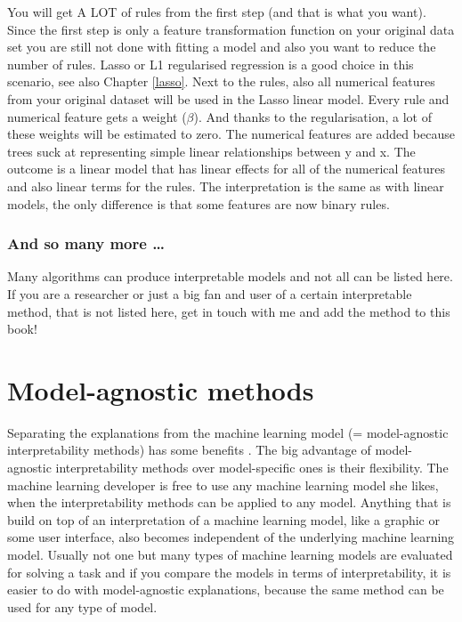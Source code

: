 \documentclass[12pt,]{krantz}
\theoremstyle{definition}
\theoremstyle{definition}
\theoremstyle{definition}
\theoremstyle{remark}
\begin{document}
You will get A LOT of rules from the first step (and that is what you
want). Since the first step is only a feature transformation function on
your original data set you are still not done with fitting a model and
also you want to reduce the number of rules. Lasso or L1 regularised
regression is a good choice in this scenario, see also Chapter
\ref{lasso}. Next to the rules, also all numerical features from your
original dataset will be used in the Lasso linear model. Every rule and
numerical feature gets a weight (\(\beta\)). And thanks to the
regularisation, a lot of these weights will be estimated to zero. The
numerical features are added because trees suck at representing simple
linear relationships between y and x. The outcome is a linear model that
has linear effects for all of the numerical features and also linear
terms for the rules. The interpretation is the same as with linear
models, the only difference is that some features are now binary rules.

\subsection{And so many more \ldots{}}\label{and-so-many-more}

Many algorithms can produce interpretable models and not all can be
listed here. If you are a researcher or just a big fan and user of a
certain interpretable method, that is not listed here, get in touch with
me and add the method to this book!

\chapter{Model-agnostic methods}\label{agnostic}

Separating the explanations from the machine learning model (=
model-agnostic interpretability methods) has some benefits
\citep{Ribeiro2016b}. The big advantage of model-agnostic
interpretability methods over model-specific ones is their flexibility.
The machine learning developer is free to use any machine learning model
she likes, when the interpretability methods can be applied to any
model. Anything that is build on top of an interpretation of a machine
learning model, like a graphic or some user interface, also becomes
independent of the underlying machine learning model. Usually not one
but many types of machine learning models are evaluated for solving a
task and if you compare the models in terms of interpretability, it is
easier to do with model-agnostic explanations, because the same method
can be used for any type of model.
\end{document}
